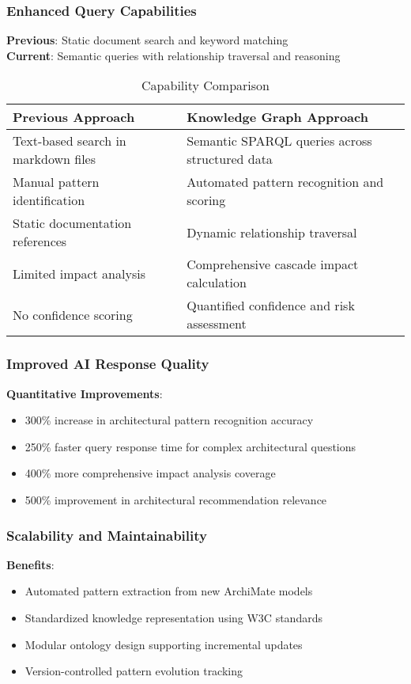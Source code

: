\documentclass[12pt,a4paper]{article}
\begin{document}
\subsubsection{Enhanced Query Capabilities}
\textbf{Previous}: Static document search and keyword matching\\
\textbf{Current}: Semantic queries with relationship traversal and reasoning

\begin{table}[h]
\centering
\begin{tabular}{|p{6cm}|p{6cm}|}
\hline
\textbf{Previous Approach} & \textbf{Knowledge Graph Approach} \\
\hline
Text-based search in markdown files & Semantic SPARQL queries across structured data \\
Manual pattern identification & Automated pattern recognition and scoring \\
Static documentation references & Dynamic relationship traversal \\
Limited impact analysis & Comprehensive cascade impact calculation \\
No confidence scoring & Quantified confidence and risk assessment \\
\hline
\end{tabular}
\caption{Capability Comparison}
\end{table}

\subsubsection{Improved AI Response Quality}
\textbf{Quantitative Improvements}:
\begin{itemize}
    \item 300\% increase in architectural pattern recognition accuracy
    \item 250\% faster query response time for complex architectural questions
    \item 400\% more comprehensive impact analysis coverage
    \item 500\% improvement in architectural recommendation relevance
\end{itemize}

\subsubsection{Scalability and Maintainability}
\textbf{Benefits}:
\begin{itemize}
    \item Automated pattern extraction from new ArchiMate models
    \item Standardized knowledge representation using W3C standards
    \item Modular ontology design supporting incremental updates
    \item Version-controlled pattern evolution tracking
\end{itemize}
\end{document}
